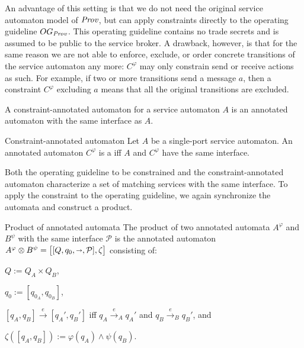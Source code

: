 An advantage of this setting is that we do not need the original service automaton model of $\mathit{Prov}$, but can apply constraints directly to the operating guideline $\mathop{OG}_{\mathit{Prov}}$. This operating guideline contains no trade secrets and is assumed to be public to the service broker. A drawback, however, is that for the same reason we are not able to enforce, exclude, or order concrete transitions of the service automaton any more: $C^\varphi$ may only constrain send or receive actions as such. For example, if two or more transitions send a message $a$, then a constraint $C^\varphi$ excluding $a$ means that all the original transitions are excluded.

A constraint-annotated automaton for a service automaton $A$ is an annotated automaton with the same interface as $A$.

\begin{definition}{Constraint-annotated automaton}
Let $A$ be a single-port service automaton. An annotated automaton $C^\varphi$ is a  iff $A$ and $C^\varphi$ have the same interface.
\end{definition}

Both the operating guideline to be constrained and the constraint-annotated automaton characterize a set of matching services with the same interface. To apply the constraint to the operating guideline, we again synchronize the automata and construct a product.

\begin{definition}{Product of annotated automata}
\label{def:product_og}%
The product of two annotated automata $A^{\varphi}$ and $B^{\psi}$ with the same interface $\mathcal{P}$ is the annotated automaton $A^{\varphi}\otimes B^{\psi}=\bigl[[Q,q_{0},{\shortrightarrow},\mathcal{P}],\zeta\bigr]$ consisting of:
\begin{myitemize}
\item $Q:=Q_{A}\times Q_{B}$,
\item $q_{0}:=[q_{0_{A}},q_{0_{B}}]$,
\item $[q_{A},q_{B}]\xrightarrow{e}[q_{A}',q_{B}']$ iff $q_{A}\xrightarrow{e}_{A} q_{A}'$ and $q_{B}\xrightarrow{e}_{B}q_{B}'$, and
\item $\zeta([q_{A},q_{B}]):=\varphi(q_{A})\wedge\psi(q_{B})$.
\end{myitemize}
\end{definition}

